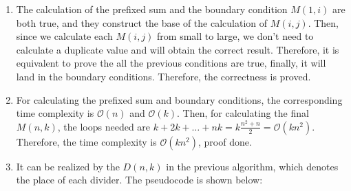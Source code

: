 \documentclass[12pt, a4paper]{article}
\begin{document}
\begin{enumerate}
          \begin{algorithm}[!htb]
              \caption{Dynamic Programming for Linear Partition Problem}
              
          \end{algorithm}
    \item The calculation of the prefixed sum and the boundary condition $M(1, i)$ are both true, 
          and they construct the base of the calculation of $M(i, j)$. Then, since we calculate each $M(i, j)$ from small to large, 
          we don't need to calculate a duplicate value and will obtain the correct result. Therefore, 
          it is equivalent to prove the all the previous conditions are true, finally, it will land in the boundary conditions.
          Therefore, the correctness is proved.
    \item For calculating the prefixed sum and boundary conditions, the corresponding time complexity is $\mathcal{O}(n)$ and $\mathcal{O}(k)$. 
          Then, for calculating the final $M(n, k)$, the loops needed are $k + 2k + \dots + nk = k\frac{n^2 + n}{2} = \mathcal{O}(kn^2)$. 
          Therefore, the time complexity is $\mathcal{O}(kn^2)$, proof done.
    \item It can be realized by the $D(n,k)$ in the previous algorithm, which denotes the place of each divider. The pseudocode is shown below:
          

\end{enumerate}
\end{document}
